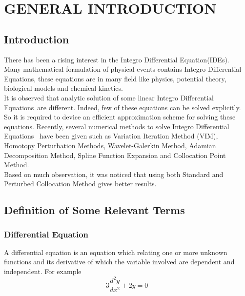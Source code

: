 \documentclass[12pt]{report}
\newcommand{\IDE}{Integro Differential Equation}
\newcommand{\IDEs}{Integro Differential Equations}
\newcommand{\NI}{\noindent}
\begin{document}
	\newpage
	\tableofcontents
	
	\newpage
	\chapter{GENERAL INTRODUCTION}
	
	\section{Introduction}
	There has been a rising interest in the \IDE (IDEs).\\
	
	\NI Many mathematical formulation of physical events contains \IDEs, these equations are in many field like physics, potential theory, biological models and chemical kinetics.\\
	
	\NI It is observed that analytic solution of some linear \IDEs ~are different. Indeed, few of these equations can be solved explicitly. So it is required to device an efficient approximation scheme for solving these equations. Recently, several numerical methods to solve \IDEs~ have been given such as Variation Iteration Method (VIM), Homotopy Perturbation Methods, Wavelet-Galerkin Method, Adamian Decomposition Method, Spline Function Expansion and Collocation Point Method.\\
	
	\NI Based on much observation, it was noticed that using both Standard and Perturbed Collocation Method gives better results.\\
	
	\section{Definition of Some Relevant Terms} 
	
	\subsection{Differential Equation}
	A differential equation is an equation which relating one or more unknown functions and its derivative of which the variable involved are dependent and independent. For example
	\begin{equation}
		3\frac{d^2y}{dx^2} + 2y = 0
	\end{equation}
	
\end{document}
